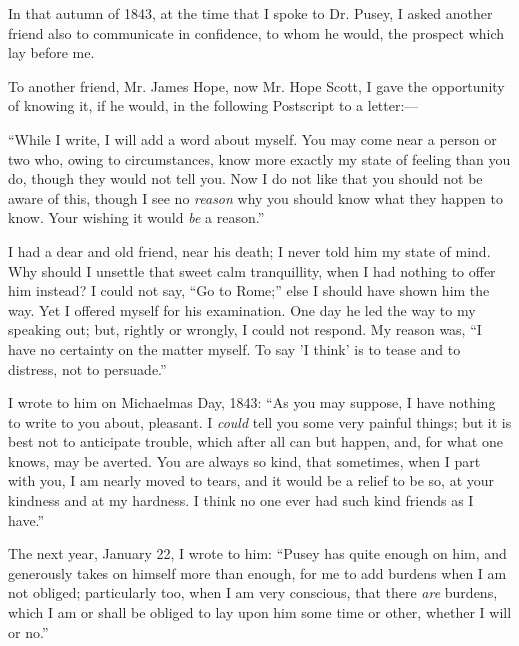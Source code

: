 In that autumn of 1843, at the time that I spoke to Dr. Pusey, I
asked another friend also to communicate in confidence,
to whom he would, the prospect which lay before me.

To another friend, Mr. James Hope, now Mr. Hope Scott, I gave
the opportunity of knowing it, if he would, in the following Postscript
to a letter:—

``While I write, I will add a word about myself. You may come
near a person or two who, owing to circumstances, know more exactly my
state of feeling than you do, though they would not tell you. Now I do
not like that you should not be aware of this, though I see no \emph{reason}
why you should know what they happen to know. Your wishing it would \emph{be} a reason.''

I had a dear and old friend, near his death; I never told him my
state of mind. Why should I unsettle that sweet calm tranquillity, when
I had nothing to offer him instead? I could not say, ``Go to Rome;''
else I should have shown him the way. Yet I offered myself for his
examination. One day he led the way to my speaking out; but, rightly or
wrongly, I could not respond. My reason was, ``I have no certainty
on the matter myself. To say 'I think' is to tease and to distress, not
to persuade.''

I wrote to him on Michaelmas Day, 1843: ``As you may suppose, I
have nothing to write to you about, pleasant. I \emph{could} tell you
some very painful things; but it is best not to anticipate trouble,
which after all can but happen, and, for what one knows, may be averted.
You are always so kind, that sometimes, when I part with you, I am
nearly moved to tears, and it would be a relief to be so, at your
kindness and at my hardness. I think no one ever had such kind friends
as I have.''

The next year, January 22, I wrote to him: ``Pusey has quite
enough on him, and generously takes on himself more than enough, for me
to add burdens when I am not obliged; particularly too, when I am very
conscious, that there \emph{are} burdens, which I am or shall be obliged
to lay upon him some time or other, whether I will or no.''

